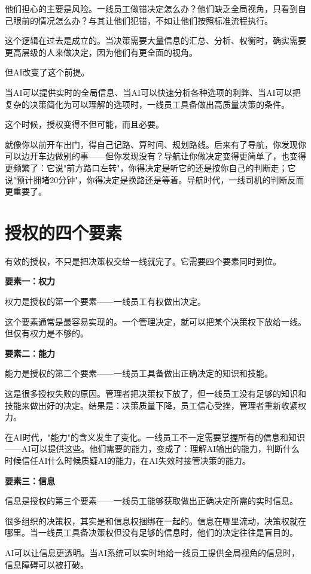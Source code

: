他们担心的主要是风险。一线员工做错决定怎么办？他们缺乏全局视角，只看到自己眼前的情况怎么办？与其让他们犯错，不如让他们按照标准流程执行。

这个逻辑在过去是成立的。当决策需要大量信息的汇总、分析、权衡时，确实需要更高层级的人来做决定，因为他们有更全面的视角。

但AI改变了这个前提。

当AI可以提供实时的全局信息、当AI可以快速分析各种选项的利弊、当AI可以把复杂的决策简化为可以理解的选项时，一线员工具备做出高质量决策的条件。

这个时候，授权变得不但可能，而且必要。

就像你以前开车出门，得自己记路、算时间、规划路线。后来有了导航，你发现你可以边开车边做别的事——但你发现没有？导航让你做决定变得更简单了，也变得更频繁了：它说"前方路口左转"，你得决定是听它的还是按你自己的判断走；它说"预计拥堵20分钟"，你得决定是换路还是等着。导航时代，一线司机的判断反而更重要了。

\section{授权的四个要素}


有效的授权，不只是把决策权交给一线就完了。它需要四个要素同时到位。

\textbf{要素一：权力}

权力是授权的第一个要素——一线员工有权做出决定。

这个要素通常是最容易实现的。一个管理决定，就可以把某个决策权下放给一线。但仅有权力是不够的。

\textbf{要素二：能力}

能力是授权的第二个要素——一线员工具备做出正确决定的知识和技能。

这是很多授权失败的原因。管理者把决策权下放了，但一线员工没有足够的知识和技能来做出好的决定。结果是：决策质量下降，员工信心受挫，管理者重新收紧权力。

在AI时代，"能力"的含义发生了变化。一线员工不一定需要掌握所有的信息和知识——AI可以提供这些。他们需要的能力，变成了：理解AI输出的能力，判断什么时候信任AI什么时候质疑AI的能力，在AI失效时接管决策的能力。

\textbf{要素三：信息}

信息是授权的第三个要素——一线员工能够获取做出正确决定所需的实时信息。

很多组织的决策权，其实是和信息权捆绑在一起的。信息在哪里流动，决策权就在哪里。当一线员工具备决策权但没有足够的信息时，他们的决定往往是盲目的。

AI可以让信息更透明。当AI系统可以实时地给一线员工提供全局视角的信息时，信息障碍可以被打破。

